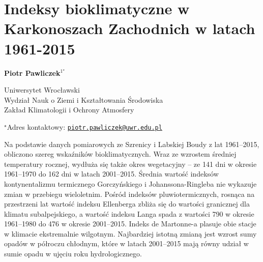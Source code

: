 \documentclass[\main/boa.tex]{subfiles}
\begin{document}
\section{Indeksy bioklimatyczne w Karkonoszach Zachodnich w latach 1961-2015}

\begin{center}
  {\bf {} Piotr Pawliczek$^{1^\star}$}
\end{center}

\vskip 0.3cm

\begin{affiliations}
\begin{enumerate}
\begin{minipage}{0.915\textwidth}
\centering
\item Uniwersytet Wrocławski\\ Wydział Nauk o Ziemi i Kształtowania Środowiska\\ Zakład Klimatologii i Ochrony Atmosfery\\[-2pt]
\end{minipage}
\end{enumerate}
$^\star$Adres kontaktowy: \href{mailto:piotr.pawliczek@uwr.edu.pl}{\nolinkurl{piotr.pawliczek@uwr.edu.pl}}\\
\end{affiliations}

\vskip 0.5cm


\vskip 0.5cm

Na podstawie danych pomiarowych ze Szrenicy i Labskiej Boudy z lat 1961--2015, obliczono szereg wskaźników bioklimatycznych. Wraz ze wzrostem średniej temperatury rocznej, wydłuża się także okres wegetacyjny -- ze 141 dni w okresie 1961--1970 do 162 dni w latach 2001--2015. Średnia wartość indeksów kontynentalizmu termicznego Gorczyńskiego i Johanssona-Ringleba nie wykazuje zmian w przebiegu wieloletnim. Pośród indeksów pluwiotermicznych, rosnąca na przestrzeni lat wartość indeksu Ellenberga zbliża się do wartości granicznej dla klimatu subalpejskiego, a wartość indeksu Langa spada z wartości 790 w okresie 1961--1980 do 476 w okresie 2001--2015. Indeks  de Martonne-a plasuje obie stacje w klimacie ekstremalnie wilgotnym. Najbardziej istotną zmianą jest wzrost sumy opadów w półroczu chłodnym, które w latach 2001--2015 mają równy udział w sumie opadu w ujęciu roku hydrologicznego.
\end{document}
